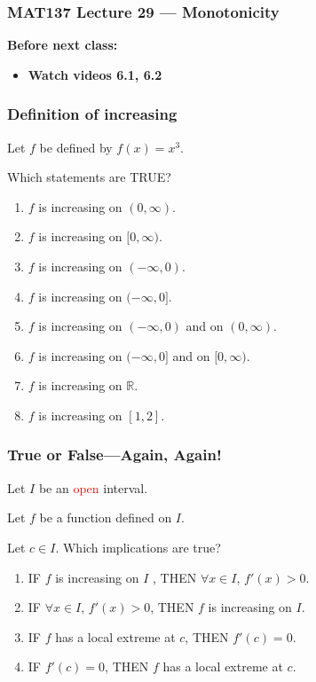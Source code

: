 \documentclass[14pt]{beamer}
\begin{document}
\begin{frame}
	\frametitle{MAT137 Lecture 29 --- Monotonicity}

	\vfill
	{\bf Before next class:}
		\begin{itemize} \normalsize
			\item {\bf Watch videos  6.1, 6.2}
		\end{itemize}
\end{frame}

	\begin{frame}[t]
		\frametitle{Definition of increasing}

		Let $f$ be defined by $f(x)=x^3$.

		Which statements are TRUE?

		\begin{enumerate}
			\item $f$ is increasing on $(0,\infty)$.
			\item $f$ is increasing on $[0,\infty)$.
			\item $f$ is increasing on $(-\infty, 0)$.
			\item $f$ is increasing on $(-\infty, 0]$.
			\item $f$ is increasing on $(-\infty, 0)$ and on $(0,\infty)$.
			\item $f$ is increasing on $(-\infty, 0]$ and on $[0,\infty)$.
			\item $f$ is increasing on $\mathbb R$.
			\item $f$ is increasing on $[1,2]$.
		\end{enumerate}
	\end{frame}

	\begin{frame}[t]
		\frametitle{True or False---Again, Again!}

		Let $I$ be an \textcolor{red}{open} interval. 

		Let $f$ be a
		function defined on $I$. 

		Let $c\in I$.		Which implications are true?
		\begin{enumerate}
			\item IF $f$ is increasing on $I$ , THEN $\forall x\in I$, $f'(x)>0$.
			\item IF $\forall x\in I$, $f'(x)>0$, THEN $f$ is increasing on $I$.
			\item IF $f$ has a local extreme at $c$, THEN $f' (c ) = 0$.
			\item IF $f'(c ) = 0$, THEN $f$ has a local extreme at $c$.
		\end{enumerate}

	\end{frame}
\end{document}

